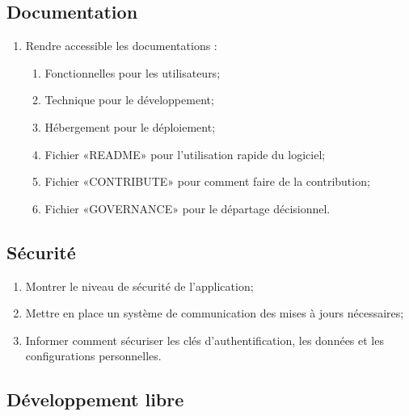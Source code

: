 \subsection{Documentation}

\begin{enumerate}
    \item Rendre accessible les documentations :
    \begin{enumerate}
        \item Fonctionnelles pour les utilisateurs;
        \item Technique pour le développement;
        \item Hébergement pour le déploiement;
        \item Fichier «README» pour l'utilisation rapide du logiciel;
        \item Fichier «CONTRIBUTE» pour comment faire de la contribution;
        \item Fichier «GOVERNANCE» pour le départage décisionnel.
    \end{enumerate}
\end{enumerate}

\subsection{Sécurité}

\begin{enumerate}
    \item Montrer le niveau de sécurité de l'application;
    \item Mettre en place un système de communication des mises à jours nécessaires;
    \item Informer comment sécuriser les clés d'authentification, les données et les configurations personnelles.
\end{enumerate}

\subsection{Développement libre}

